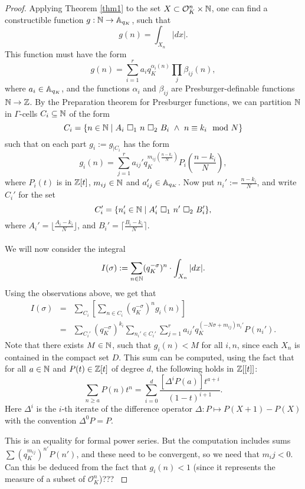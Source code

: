 \begin{proof}


Applying Theorem \ref{thm1} to the set $X \subset \cO_K^n\times \NN$, one can find a constructible function $g: \NN \to \AA_{q_K}$, such that
\[g(n) = \int_{X_n}|dx|.\]
This function must have the form 
\[g(n) = \sum_{i=1}^r a_iq_K^{\alpha_i(n)}\prod_j\beta_{ij}(n),\]
where $a_i \in \AA_{q_K}$, and the functions $\alpha_i$ and $\beta_{ij}$ are Presburger-definable functions $\NN \to \ZZ$. By the Preparation theorem for Presburger functions, we can partition $\N$ in $\Gamma$-cells $C_i \subseteq \N$ of the form
\[C_i = \{ n \in \N \mid A_i \ \square_1 \ n \ \square_2\ B_i \ \wedge\ n \equiv k_i \mod N \}\]
 such that on each part $g_i:= g_{|C_i}$ has the form 
\[g_i(n) = \sum_{j=1}^r a_{ij}'q_K^{m_{ij}(\frac{n-k_i}{N})}P_i\left(\frac{n-k_i}{N}\right),\]
where $P_i(t)$ is in $\Z[t]$, $m_{ij} \in \N$ and $a_{ij}' \in \AA_{q_K}$. 
Now put $n_i' := \frac{n-k_i}{N}$, and write $C_i'$ for the set
\[C_i'=\{n_i'\in \N \mid A_i'\ \square_1 \ n' \ \square_2 \ B_i'\},\]
where $A_i' =\lfloor \frac{A_i-k_i}{N}\rfloor$, and $B_i' =\lceil \frac{B_i-k_i}{N}\rceil$.
\\
\\
We will now consider the integral
\[I(\sigma):=\sum_{n\in\NN}(q_K^{-\sigma})^{n}\cdot \int_{X_n}|dx|.\] Using the observations above, we get that
\begin{eqnarray*}
I(\sigma) %
&=& \sum_{ C_i}\left[ \sum_{n \in C_i} (q_K^{-\sigma})^{n}g_i(n)\right]\\
&=&\sum_{C_i'}(q_K^{-\sigma})^{k_i} \sum_{n_i' \in C_i'}\sum_{j=1}^r a_{ij}'q_K^{(-N\sigma +m_{ij})n_i'}P(n_i').
\end{eqnarray*}
Note that there exists $M \in \N$, such that $g_i(n) <M$ for all $i,n$, since each $X_n$ is contained in the compact set $D$.
This sum can be computed, using the fact that for all $a \in \N$ and $P(t) \in \Z[t]$ of degree $d$, the following holds in $\Z[[t]]$:
\[\sum_{n \geqslant a} P(n)t^n =\sum_{i=0}^d	\frac{[\Delta^iP(a)]t^{a+i}}{(1 - t )^{i+1}}.\]
Here $\Delta^i$ is the $i$-th iterate of the difference operator $\Delta:P \mapsto P(X + 1) - P(X)$ with the convention $\Delta^0P = P$.

{\color{red} This is an equality for formal power series. But the computation includes sums $\sum (q_K^{m_{ij}})^{n'}P(n')$, and these need to be convergent, so we need that $m_ij <0$. Can this be deduced from the fact that $g_i(n)<1$ (since it represents the measure of a subset of $\mathcal{O}_K^n$)??? }
 

\end{proof}
